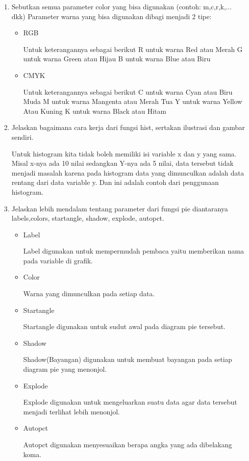 \begin{enumerate}
    \item Sebutkan semua parameter color yang bisa digunakan (contoh:  m,c,r,k,...  dkk)
    Parameter warna yang bisa digunakan dibagi menjadi 2 tipe:
    \begin{itemize}
	    \item RGB
	
	Untuk keterangannya sebagai berikut
    R untuk warna Red atau Merah
    G untuk warna Green atau Hijau
    B untuk warna Blue atau Biru
    
        \item CMYK
    
    Untuk keterangannya sebagai berikut
    C untuk warna Cyan atau Biru Muda
    M untuk warna Mangenta atau Merah Tua
    Y untuk warna Yellow Atau Kuning
    K untuk warna Black atau Hitam
    \end{itemize}
    
    \item Jelaskan bagaimana cara kerja dari fungsi hist, sertakan ilustrasi dan gambar sendiri.
    \par Untuk histogram kita tidak boleh memiliki isi variable x dan y yang sama. Misal x-nya ada 10 nilai sedangkan Y-nya ada 5 nilai, data tersebut tidak menjadi masalah karena pada histogram data yang dimunculkan adalah data rentang dari data variable y. Dan ini adalah contoh dari penggunaan histogram.
    
    
    \item Jelaskan lebih mendalam tentang parameter dari fungsi pie diantaranya labels,colors, startangle, shadow, explode, autopct.
    \begin{itemize}
        \item Label
    
    Label digunakan untuk mempermudah pembaca yaitu memberikan nama pada variable di grafik.
    
        \item Color
    
    Warna yang dimunculkan pada setiap data.
    
        \item Startangle
    
    Startangle digunakan untuk sudut awal pada diagram pie tersebut.
    
        \item Shadow
    
    Shadow(Bayangan) digunakan untuk membuat bayangan pada setiap diagram pie yang menonjol.
    
        \item Explode

    Explode digunakan untuk mengeluarkan suatu data agar data tersebut menjadi terlihat lebih menonjol.
    
        \item Autopct
    
    Autopct digunakan menyesuaikan berapa angka yang ada dibelakang koma.
\end{itemize}
\end{enumerate}
